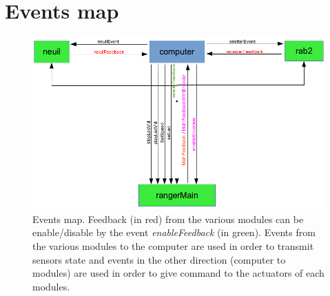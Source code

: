 \documentclass[a4paper,11pt]{report}
\begin{document}
\chapter{Events map}\label{sec:eventsMap}
\begin{figure}[H]
  \begin{center}
    \includegraphics[width=14cm]{EventMap.png}
    \caption{Events map. Feedback (in red) from the various modules can be enable/disable by the event \textit{enableFeedback} (in green). Events from the various modules to the computer are used in order to transmit sensors state and events in the other direction (computer to modules) are used in order to give command to the actuators of each modules.}
    \label{fig:EventMap}
  \end{center}
\end{figure}
\end{document}

